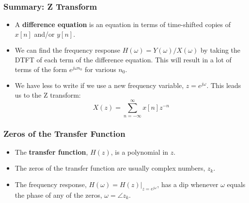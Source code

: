 \documentclass{beamer}
\begin{document}
\begin{frame}
  \frametitle{Summary: Z Transform}
  \begin{itemize}
  \item A {\bf difference equation} is an equation in terms of
    time-shifted copies of $x[n]$ and/or $y[n]$.
  \item We can find the frequency response
    $H(\omega)=Y(\omega)/X(\omega)$ by taking the DTFT of each term of
    the difference equation.  This will result in a lot of terms of
    the form $e^{j\omega n_0}$ for various $n_0$.
  \item We have less to write if we use a new frequency variable,
    $z=e^{j\omega}$.  This leads us to the Z transform:
    \[
    X(z) = \sum_{n=-\infty}^\infty x[n]z^{-n}
    \]
  \end{itemize}
\end{frame}

\begin{frame}
  \frametitle{Zeros of the Transfer Function}
  \begin{itemize}
  \item The {\bf transfer function}, $H(z)$, is a polynomial in $z$.
  \item The zeros of the transfer function are usually complex numbers, $z_k$.
  \item The frequency response, $H(\omega) = H(z)\vert_{z=e^{j\omega}}$, has a dip
    whenever $\omega$ equals the phase of any of the zeros, $\omega=\angle z_k$.
  \end{itemize}
\end{frame}
\end{document}
